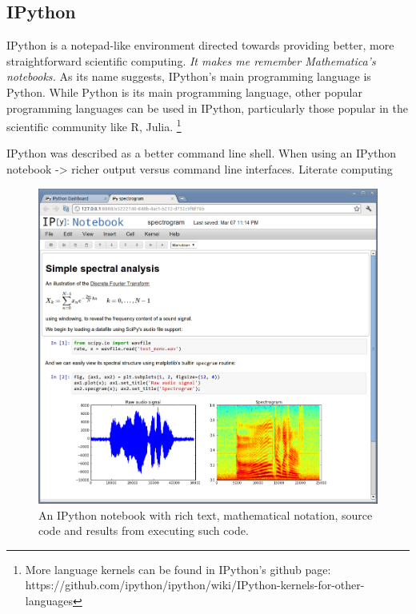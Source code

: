 \documentclass{./llncs2e/llncs}
\begin{document}

\subsection{IPython\cite{PER-GRA:2007}}
	IPython is a notepad-like environment directed towards providing better, more straightforward scientific computing. \emph{It makes me remember Mathematica's notebooks.} As its name suggests, IPython's main programming language is Python. 
	While Python is its main programming language, other popular programming languages can be used in IPython, particularly those popular in the scientific community like R, Julia. \footnote{More language kernels can be found in IPython's github page: https://github.com/ipython/ipython/wiki/IPython-kernels-for-other-languages}

	IPython was described as a better command line shell.
	When using an IPython notebook -> richer output versus command line interfaces.
	Literate computing

	\begin{figure}
		\centering
		\includegraphics[width=1.0\textwidth]{img/ipython_notebook}
			\caption{An IPython notebook with rich text, mathematical notation, source code and results from executing such code.}
		\label{fig:ipython:notebook}
	\end{figure}
\end{document}
